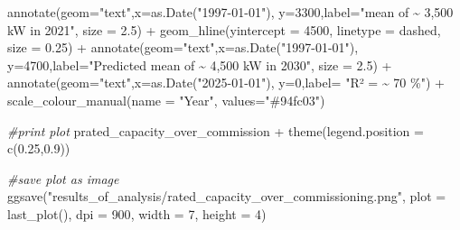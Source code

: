 \documentclass[a4paper,11pt]{article}
\newenvironment{Shaded}{\begin{snugshade}}{\end{snugshade}}
\newcommand{\AttributeTok}[1]{\textcolor[rgb]{0.77,0.63,0.00}{#1}}
\newcommand{\CommentTok}[1]{\textcolor[rgb]{0.56,0.35,0.01}{\textit{#1}}}
\newcommand{\DecValTok}[1]{\textcolor[rgb]{0.00,0.00,0.81}{#1}}
\newcommand{\FloatTok}[1]{\textcolor[rgb]{0.00,0.00,0.81}{#1}}
\newcommand{\FunctionTok}[1]{\textcolor[rgb]{0.00,0.00,0.00}{#1}}
\newcommand{\NormalTok}[1]{#1}
\newcommand{\SpecialCharTok}[1]{\textcolor[rgb]{0.00,0.00,0.00}{#1}}
\newcommand{\StringTok}[1]{\textcolor[rgb]{0.31,0.60,0.02}{#1}}
\begin{document}
\begin{Shaded}
\begin{Highlighting}[]
  \FunctionTok{annotate}\NormalTok{(}\AttributeTok{geom=}\StringTok{"text"}\NormalTok{,}\AttributeTok{x=}\FunctionTok{as.Date}\NormalTok{(}\StringTok{"1997{-}01{-}01"}\NormalTok{),}
           \AttributeTok{y=}\DecValTok{3300}\NormalTok{,}\AttributeTok{label=}\StringTok{"mean of \textasciitilde{} 3,500 kW in 2021"}\NormalTok{, }\AttributeTok{size =} \FloatTok{2.5}\NormalTok{) }\SpecialCharTok{+}
  \FunctionTok{geom\_hline}\NormalTok{(}\AttributeTok{yintercept =} \DecValTok{4500}\NormalTok{, }\AttributeTok{linetype =} \StringTok{\textquotesingle{}dashed\textquotesingle{}}\NormalTok{, }\AttributeTok{size =} \FloatTok{0.25}\NormalTok{) }\SpecialCharTok{+}
  \FunctionTok{annotate}\NormalTok{(}\AttributeTok{geom=}\StringTok{"text"}\NormalTok{,}\AttributeTok{x=}\FunctionTok{as.Date}\NormalTok{(}\StringTok{"1997{-}01{-}01"}\NormalTok{),}
           \AttributeTok{y=}\DecValTok{4700}\NormalTok{,}\AttributeTok{label=}\StringTok{"Predicted mean of \textasciitilde{} 4,500 kW in 2030"}\NormalTok{, }\AttributeTok{size =} \FloatTok{2.5}\NormalTok{) }\SpecialCharTok{+}
  \FunctionTok{annotate}\NormalTok{(}\AttributeTok{geom=}\StringTok{"text"}\NormalTok{,}\AttributeTok{x=}\FunctionTok{as.Date}\NormalTok{(}\StringTok{"2025{-}01{-}01"}\NormalTok{),}
           \AttributeTok{y=}\DecValTok{0}\NormalTok{,}\AttributeTok{label=} \StringTok{"R² = \textasciitilde{} 70 \%"}\NormalTok{) }\SpecialCharTok{+}
  \FunctionTok{scale\_colour\_manual}\NormalTok{(}\AttributeTok{name =} \StringTok{"Year"}\NormalTok{, }\AttributeTok{values=}\StringTok{"\#94fc03"}\NormalTok{) }

\CommentTok{\#print plot}
\NormalTok{prated\_capacity\_over\_commission }\SpecialCharTok{+}  \FunctionTok{theme}\NormalTok{(}\AttributeTok{legend.position =} \FunctionTok{c}\NormalTok{(}\FloatTok{0.25}\NormalTok{,}\FloatTok{0.9}\NormalTok{))}

\CommentTok{\#save plot as image}
\FunctionTok{ggsave}\NormalTok{(}\StringTok{"results\_of\_analysis/rated\_capacity\_over\_commissioning.png"}\NormalTok{,}
       \AttributeTok{plot =} \FunctionTok{last\_plot}\NormalTok{(),}
       \AttributeTok{dpi =} \DecValTok{900}\NormalTok{,}
       \AttributeTok{width =} \DecValTok{7}\NormalTok{,}
       \AttributeTok{height =} \DecValTok{4}\NormalTok{)}


\end{Highlighting}
\end{Shaded}
\end{document}
